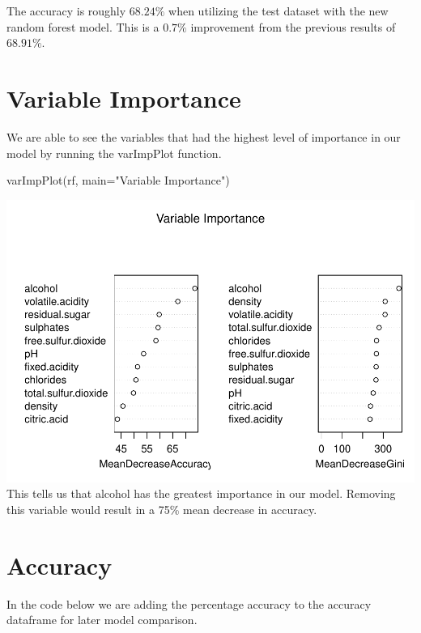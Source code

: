 \documentclass[
]{book}
\newenvironment{Shaded}{\begin{snugshade}}{\end{snugshade}}
\newcommand{\AttributeTok}[1]{\textcolor[rgb]{0.77,0.63,0.00}{#1}}
\newcommand{\FunctionTok}[1]{\textcolor[rgb]{0.00,0.00,0.00}{#1}}
\newcommand{\NormalTok}[1]{#1}
\newcommand{\StringTok}[1]{\textcolor[rgb]{0.31,0.60,0.02}{#1}}
\begin{document}
The accuracy is roughly \(68.24\%\) when utilizing the test dataset with the new random forest model. This is a \(0.7\%\) improvement from the previous results of \(68.91\%\).

\hypertarget{variable-importance}{%
\section{Variable Importance}\label{variable-importance}}

We are able to see the variables that had the highest level of importance in our model by running the varImpPlot function.

\begin{Shaded}
\begin{Highlighting}[]
\FunctionTok{varImpPlot}\NormalTok{(rf, }
           \AttributeTok{main=}\StringTok{"Variable Importance"}\NormalTok{)}
\end{Highlighting}
\end{Shaded}

\includegraphics{FinalProject-Bright-Santoro_files/figure-latex/unnamed-chunk-25-1.pdf}
This tells us that alcohol has the greatest importance in our model. Removing this variable would result in a 75\% mean decrease in accuracy.

\hypertarget{accuracy}{%
\section{Accuracy}\label{accuracy}}

In the code below we are adding the percentage accuracy to the accuracy dataframe for later model comparison.
\end{document}
